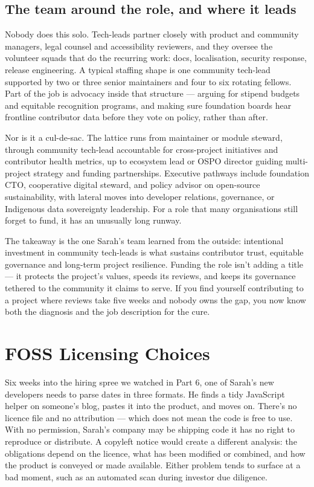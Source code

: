 \subsection{The team around the role, and where it leads}


Nobody does this solo. Tech-leads partner closely with product and community managers, legal counsel and accessibility reviewers, and they oversee the volunteer squads that do the recurring work: docs, localisation, security response, release engineering. A typical staffing shape is one community tech-lead supported by two or three senior maintainers and four to six rotating fellows. Part of the job is advocacy inside that structure — arguing for stipend budgets and equitable recognition programs, and making sure foundation boards hear frontline contributor data before they vote on policy, rather than after.


Nor is it a cul-de-sac. The lattice runs from maintainer or module steward, through community tech-lead accountable for cross-project initiatives and contributor health metrics, up to ecosystem lead or OSPO director guiding multi-project strategy and funding partnerships. Executive pathways include foundation CTO, cooperative digital steward, and policy advisor on open-source sustainability, with lateral moves into developer relations, governance, or Indigenous data sovereignty leadership. For a role that many organisations still forget to fund, it has an unusually long runway.


The takeaway is the one Sarah's team learned from the outside: intentional investment in community tech-leads is what sustains contributor trust, equitable governance and long-term project resilience. Funding the role isn't adding a title — it protects the project's values, speeds its reviews, and keeps its governance tethered to the community it claims to serve. If you find yourself contributing to a project where reviews take five weeks and nobody owns the gap, you now know both the diagnosis and the job description for the cure.

\section{FOSS Licensing Choices}
Six weeks into the hiring spree we watched in Part 6, one of Sarah's new developers needs to parse dates in three formats. He finds a tidy JavaScript helper on someone's blog, pastes it into the product, and moves on. There's no licence file and no attribution — which does not mean the code is free to use. With no permission, Sarah's company may be shipping code it has no right to reproduce or distribute. A copyleft notice would create a different analysis: the obligations depend on the licence, what has been modified or combined, and how the product is conveyed or made available. Either problem tends to surface at a bad moment, such as an automated scan during investor due diligence.


